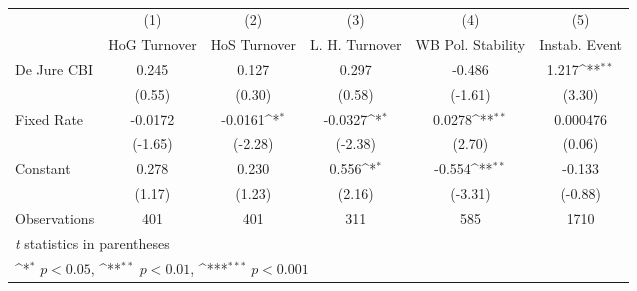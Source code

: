 \begin{table}[htbp]\centering
\def\sym#1{\ifmmode^{#1}\else\(^{#1}\)\fi}
\caption{\label{nondemocraciesFEDJ}}
\begin{tabular}{l*{5}{c}}
\toprule
                                        &\multicolumn{1}{c}{(1)}&\multicolumn{1}{c}{(2)}&\multicolumn{1}{c}{(3)}&\multicolumn{1}{c}{(4)}&\multicolumn{1}{c}{(5)}\\
                                        &\multicolumn{1}{c}{HoG Turnover}&\multicolumn{1}{c}{HoS Turnover}&\multicolumn{1}{c}{L. H. Turnover}&\multicolumn{1}{c}{WB Pol. Stability}&\multicolumn{1}{c}{Instab. Event}\\
\midrule
De Jure CBI                             &    0.245         &    0.127         &    0.297         &   -0.486         &    1.217\sym{**} \\
                                        &   (0.55)         &   (0.30)         &   (0.58)         &  (-1.61)         &   (3.30)         \\
\addlinespace
Fixed Rate                              &  -0.0172         &  -0.0161\sym{*}  &  -0.0327\sym{*}  &   0.0278\sym{**} & 0.000476         \\
                                        &  (-1.65)         &  (-2.28)         &  (-2.38)         &   (2.70)         &   (0.06)         \\
\addlinespace
Constant                                &    0.278         &    0.230         &    0.556\sym{*}  &   -0.554\sym{**} &   -0.133         \\
                                        &   (1.17)         &   (1.23)         &   (2.16)         &  (-3.31)         &  (-0.88)         \\
\midrule
Observations                            &      401         &      401         &      311         &      585         &     1710         \\
\bottomrule
\multicolumn{6}{l}{\footnotesize \textit{t} statistics in parentheses}\\
\multicolumn{6}{l}{\footnotesize \sym{*} \(p<0.05\), \sym{**} \(p<0.01\), \sym{***} \(p<0.001\)}\\
\end{tabular}
\end{table}
